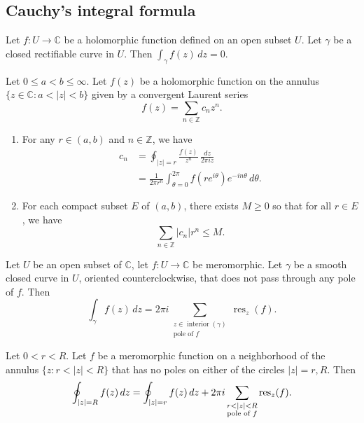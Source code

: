 \documentclass[reqno]{amsart}  \numberwithin{theorem}{section} \numberwithin{equation}{section}
\begin{document}
\subsection{Cauchy's integral formula}
\begin{theorem}
  Let $f : U \rightarrow \mathbb{C} $ be a holomorphic function defined on an open subset $U$.  Let $\gamma$ be a closed rectifiable curve in $U$.  Then $\int_\gamma f(z) \, d z = 0$.
\end{theorem}

\begin{theorem}\label{theorem:cj3vqbjd26}
  Let $0 \leq a < b \leq \infty$.  Let $f(z)$ be a holomorphic function on the annulus $\{z \in \mathbb{C} : a < \lvert z \rvert < b\}$ given by a convergent Laurent series
  \begin{equation*}
    f(z) = \sum_{n \in \mathbb{Z} } c_n z^n.
  \end{equation*}
  \begin{enumerate}
  \item For any $r \in (a,b)$ and $n \in \mathbb{Z}$, we have
    \begin{align*}
      c_n &=  \oint_{\lvert z \rvert = r} \frac{f(z)}{z^{n}} \, \frac{d z}{2 \pi i z} \\
          &= \frac{1}{2 \pi r^n } \int_{\theta = 0 }^{2 \pi } f (r e^{i \theta }) e^{- i n \theta } \,d \theta.
    \end{align*}
  \item For each compact subset $E$ of $(a,b)$, there exists $M \geq 0$ so that for all $r \in E$, we have
    \begin{equation}\label{eq:cj3vqbiupy}
      \sum_{n \in \mathbb{Z}} \lvert c_n \rvert r^n \leq M.
    \end{equation}
  \end{enumerate}
\end{theorem}

\begin{theorem}\label{theorem:cj3wnb89dd}
  Let $U$ be an open subset of $\mathbb{C}$, let $f : U \rightarrow \mathbb{C} $ be meromorphic.  Let $\gamma$ be a smooth closed curve in $U$, oriented counterclockwise, that does not pass through any pole of $f$.  Then
  \begin{equation*}
    \int_\gamma f(z) \, d z = 2 \pi i \sum_{\substack{z \in \operatorname{interior}(\gamma) \\ \text{pole of $f$}}} \operatorname{res}_z(f).
  \end{equation*}
\end{theorem}
\begin{remark}
  Let $0 < r < R$.  Let $f$ be a meromorphic function on a neighborhood of the annulus $\{z : r < |z| < R\}$ that has no poles on either of the circles $|z| = r, R$.  Then
  \begin{equation*}
    \oint_{|z| = R} f(z) \, d z
    =
    \oint_{|z| = r} f(z) \, d z
    + 2 \pi i \sum_{
      \substack{
        r < |z| < R 
        \\
        \text{pole of $f$}
      }
    }
    \operatorname{res}_z(f).
  \end{equation*}
\end{remark}
\end{document}
